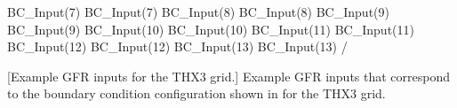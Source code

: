 \begin{minipage}{\textwidth}
\begin{nmldescitem}[%
   fontupper=\ttfamily\footnotesize%
  ,listing options={escapeinside={!@}{!@}}%
]
  BC_Input(7)%
  BC_Input(7)%
  BC_Input(8)%
  BC_Input(8)%
  BC_Input(9)%
  BC_Input(9)%
  BC_Input(10)%
  BC_Input(10)%
  BC_Input(11)%
  BC_Input(11)%
  BC_Input(12)%
  BC_Input(12)%
  BC_Input(13)%
  BC_Input(13)%
/
\end{nmldescitem}
            [Example GFR inputs for the THX3 grid.]%
            {Example GFR inputs that correspond to the boundary condition
             configuration shown in  for the THX3
             grid.}
  \label{TBL:Files:THX3:BCInputs}
\end{minipage}


